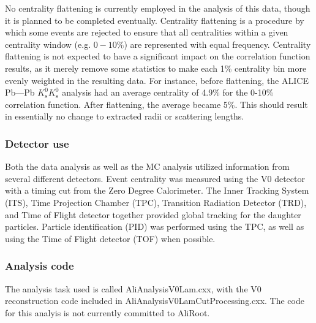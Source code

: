 No centrality flattening is currently employed in the analysis of this data, though it is planned to be completed eventually.  
Centrality flattening is a procedure by which some events are rejected to ensure that all centralities within a given centrality window (e.g. $0-10\%$) are represented with equal frequency.  
Centrality flattening is not expected to have a significant impact on the correlation function results, as it merely remove some statistics to make each 1\% centrality bin more evenly weighted in the resulting data.  
For instance, before flattening, the ALICE Pb---Pb $K^0_\mathrm{s}K^0_\mathrm{s}$ analysis had an average centrality of 4.9\% for the 0-10\% correlation function.  
After flattening, the average became 5\%.  
This should result in essentially no change to extracted radii or scattering lengths.

\subsubsection{Detector use}
Both the data analysis as well as the MC analysis utilized information from several different detectors.  
Event centrality was measured using the V0 detector with a timing cut from the Zero Degree Calorimeter.  
The Inner Tracking System (ITS), Time Projection Chamber (TPC), Transition Radiation Detector (TRD), and Time of Flight detector together provided global tracking for the daughter particles.  
Particle identification (PID) was performed using the TPC, as well as using the Time of Flight detector (TOF) when possible.

\subsubsection{Analysis code}
The analysis task used is called AliAnalysisV0Lam.cxx, with the V0 reconstruction code included in AliAnalysisV0LamCutProcessing.cxx.  
The code for this analyis is not currently committed to AliRoot.
